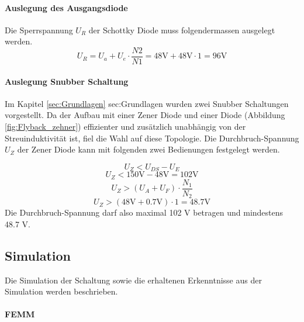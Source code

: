 \paragraph{Auslegung des Ausgangsdiode}
Die Sperrspannung $ U_{R} $ der Schottky Diode muss folgendermassen ausgelegt werden.
\begin{equation}\label{eq:sperrspannung_diode}
U_{R} = U_{a} + U_{e} \cdot \frac{N2}{N1} = 48\mathrm{V} + 48\mathrm{V} \cdot 1 = 96\mathrm{V}
\end{equation}

\paragraph{Auslegung  Snubber Schaltung}
Im Kapitel \ref{sec:Grundlagen} \refname{sec:Grundlagen} wurden zwei Snubber Schaltungen vorgestellt. Da der Aufbau mit einer Zener Diode und einer Diode (Abbildung \ref{fig:Flyback_zehner}) effizienter und zusätzlich unabhängig von der Streuinduktivität ist, fiel die Wahl auf diese Topologie. Die Durchbruch-Spannung $ U_{Z} $ der Zener Diode kann mit folgenden zwei Bedienungen festgelegt werden.  

\begin{equation}\label{eq:sperrspannung_zener1}
U_{Z} < U_{DS} - U_{E}
\end{equation}
\begin{equation}\label{eq:sperrspannung_zener1_berechnet}
U_{Z} <  150\mathrm{V} - 48\mathrm{V}  = 102\mathrm{V}
\end{equation}
\begin{equation}\label{eq:sperrspannung_zehner2}
U_{Z} > (U_{A} + U_{F}) \cdot \frac{N_{1}}{N_{2}}
\end{equation}
\begin{equation}\label{eq:sperrspannung_zehner2_berechnet}
U_{Z} >(48\mathrm{V} + 0.7\mathrm{V}) \cdot 1 = 48.7\mathrm{V}
\end{equation}
Die Durchbruch-Spannung darf also maximal 102 V betragen und mindestens 48.7 V.


\subsection{Simulation}\label{sec:simulation}
Die Simulation der Schaltung sowie die erhaltenen Erkenntnisse aus der Simulation werden beschrieben.  

\paragraph{FEMM}

